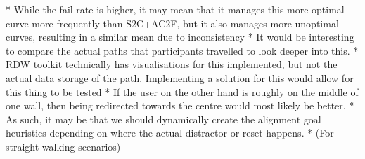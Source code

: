       * While the fail rate is higher, it may mean that it manages this more optimal curve more frequently than S2C+AC2F, but it also manages more unoptimal curves, resulting in a similar mean due to inconsistency
      * It would be interesting to compare the actual paths that participants travelled to look deeper into this.
         * RDW toolkit technically has visualisations for this implemented, but not the actual data storage of the path. Implementing a solution for this would allow for this thing to be tested
      * If the user on the other hand is roughly on the middle of one wall, then being redirected towards the centre would most likely be better.
      * As such, it may be that we should dynamically create the alignment goal heuristics depending on where the actual distractor or reset happens. 
        * (For straight walking scenarios)